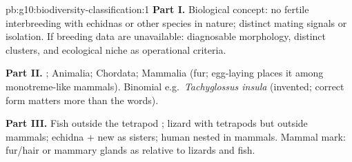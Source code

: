 \begin{solution}{pb:g10:biodiversity-classification:1}
\textbf{Part I.} Biological concept: no fertile interbreeding with echidnas
or other species in nature; distinct mating signals or isolation. If breeding
data are unavailable: diagnosable morphology, distinct  clusters, and
ecological niche as operational criteria.

\textbf{Part II.}  ;  Animalia;  Chordata; 
Mammalia (fur; egg-laying places it among monotreme-like mammals). Binomial
e.g.\ \emph{Tachyglossus insula} (invented; correct form matters more than the
words).

\textbf{Part III.} Fish outside the tetrapod ; lizard with tetrapods but
outside mammals; echidna + new  as sisters; human nested in mammals.
Mammal  mark: fur/hair or mammary glands as 
relative to lizards and fish.
\end{solution}
